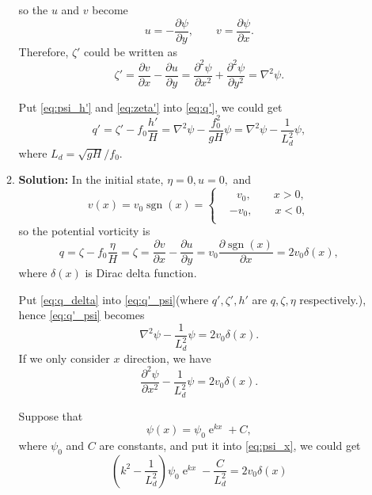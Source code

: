\documentclass[a4paper]{article}
\begin{document}
\begin{enumerate}[label=\textbf{\arabic*.}]
\begin{enumerate}[label=\textbf{(\alph*)}]
		so the $u$ and $v$ become 
		$$u = -\frac{\partial \psi}{\partial y}, \qquad v = \frac{\partial \psi}{\partial x}.$$
		Therefore, $\zeta'$ could be written as
		\begin{equation}\label{eq:zeta'}
			\zeta'=\frac{\partial v}{\partial x}-\frac{\partial u}{\partial y}=\frac{\partial^2 \psi}{\partial x^2}+\frac{\partial^2 \psi}{\partial y^2}=\nabla ^2\psi.
		\end{equation}		
		
		Put \eqref{eq:psi_h'} and \eqref{eq:zeta'} into \eqref{eq:q'}, we could get
		\begin{equation}\label{eq:q'_psi}
			q'=\zeta'-f_0\frac{h'}{H}= \nabla ^2\psi-\frac{f_0^2}{gH}\psi=\nabla ^2\psi-\frac{1}{L_d^2}\psi,
		\end{equation}
		where $L_d=\sqrt{gH}/f_0$.	\\
		
		\item \textbf{Solution:} In the initial state, $\eta =0, u=0,$
		and 
		\begin{equation}
			v(x)=v_0 \operatorname{sgn}(x)=\left\{
			\begin{aligned}
				& ~~~v_0, \qquad x>0,\\
				& -v_0, \qquad x<0,\\
			\end{aligned}\right.
		\end{equation}
		so the potential vorticity is
		\begin{equation}\label{eq:q_delta}
			q=\zeta -f_0\frac{\eta}{H}=\zeta =\frac{\partial v}{\partial x}-\frac{\partial u}{\partial y}=v_0\frac{\partial \operatorname{sgn}(x)}{\partial x}=2v_0\delta(x),
		\end{equation}
		where $\delta(x)$ is Dirac delta function.
		
		Put \eqref{eq:q_delta} into \eqref{eq:q'_psi}(where $q', \zeta', h'$ are $q, \zeta ,\eta $ respectively.), hence \eqref{eq:q'_psi} becomes 
		\begin{equation}
			\nabla ^2\psi-\frac{1}{L_d^2}\psi=2v_0\delta(x).
		\end{equation}
		If we only consider $x$ direction, we have
		\begin{equation}\label{eq:psi_x}
		\frac{\partial^2 \psi}{\partial x^2}-\frac{1}{L_d^2}\psi=2v_0\delta(x).
		\end{equation}
		
		Suppose that
		$$\psi(x) = \psi_0\operatorname{e}^{kx}+C,$$
		where $\psi_0$ and $C$ are constants, and put it into \eqref{eq:psi_x}, we could get
		$$\left(k^2-\frac{1}{L_d^2}\right)\psi_0\operatorname{e}^{kx} -\frac{C}{L_d^2}= 2v_0\delta(x)$$  
		

\end{enumerate}
\end{enumerate}
\end{document}
